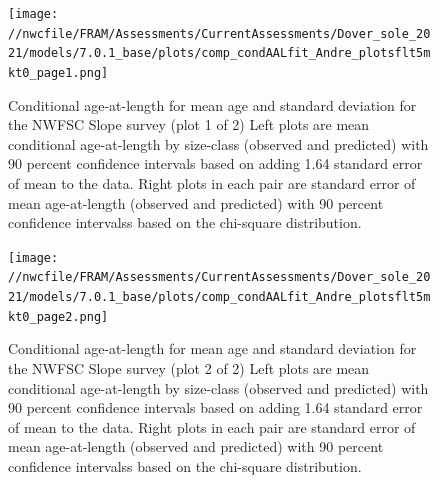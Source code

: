 \documentclass[11pt,
  english,
  a4paper,
]{article}
\begin{document}
\begin{figure}
\centering
\texttt{[image: //nwcfile/FRAM/Assessments/CurrentAssessments/Dover\_sole\_2021/models/7.0.1\_base/plots/comp\_condAALfit\_Andre\_plotsflt5mkt0\_page1.png]}
\caption{Conditional age-at-length for mean age and standard deviation for the NWFSC Slope survey (plot 1 of 2) Left plots are mean conditional age-at-length by size-class (observed and predicted) with 90 percent confidence intervals based on adding 1.64 standard error of mean to the data. Right plots in each pair are standard error of mean age-at-length (observed and predicted) with 90 percent confidence intervalss based on the chi-square distribution.\label{fig:nwslope-caal-fit-1}}
\end{figure}

\tagmcend\tagstructend


\begin{figure}
\centering
\texttt{[image: //nwcfile/FRAM/Assessments/CurrentAssessments/Dover\_sole\_2021/models/7.0.1\_base/plots/comp\_condAALfit\_Andre\_plotsflt5mkt0\_page2.png]}
\caption{Conditional age-at-length for mean age and standard deviation for the NWFSC Slope survey (plot 2 of 2) Left plots are mean conditional age-at-length by size-class (observed and predicted) with 90 percent confidence intervals based on adding 1.64 standard error of mean to the data. Right plots in each pair are standard error of mean age-at-length (observed and predicted) with 90 percent confidence intervalss based on the chi-square distribution.\label{fig:nwslope-caal-fit-2}}
\end{figure}

\tagmcend\tagstructend

\end{document}
